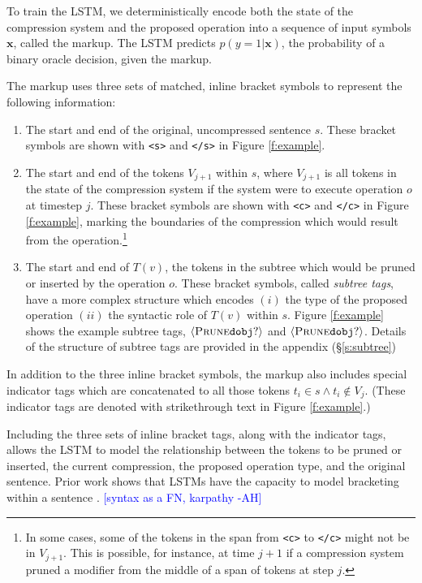 \documentclass[11pt,a4paper]{article}
\newcommand{\ahcomment}[1]{\textcolor{blue}{[#1 -AH]}}
\begin{document}
To train the LSTM, we deterministically encode both the state of the compression system and the proposed operation into a sequence of input symbols $\bm{x}$, called the markup. The LSTM predicts $p(y=1 | \bm{x})$, the probability of a binary oracle decision, given the markup. 

The markup uses three sets of matched, inline bracket symbols to represent the following information:

\begin{enumerate}
\item{The start and end of the original, uncompressed sentence $s$. These bracket symbols are shown with \texttt{<s>} and \texttt{</s>} in Figure \ref{f:example}.}
\item{The start and end of the tokens $V_{j+1}$ within $s$, where $V_{j+1}$ is all tokens in the state of the compression system if the system were to execute operation $o$ at timestep $j$. These bracket symbols are shown with \texttt{<c>} and \texttt{</c>} in Figure \ref{f:example}, marking the boundaries of the compression which would result from the operation.\footnote{In some cases, some of the tokens in the span from \texttt{<c>} to \texttt{</c>} might not be in $V_{j + 1}$. This is possible, for instance, at time $j+1$ if a compression system pruned a modifier from the middle of a span of tokens at step $j$.}}
\item{The start and end of $T(v)$, the tokens in the subtree which would be pruned or inserted by the operation $o$. These bracket symbols, called \textit{subtree tags}, have a more complex structure which encodes $(i)$ the type of the proposed operation $(ii)$ the syntactic role of $T(v)$ within $s$. Figure \ref{f:example} shows the example subtree tags, $\langle \textsc{Prune} \texttt{dobj} ? \rangle$ and $\langle \textsc{Prune} \texttt{dobj} ? \rangle$. Details of the structure of subtree tags are provided in the appendix (\S\ref{s:subtree})}
\end{enumerate}

In addition to the three inline bracket symbols, the markup also includes special indicator tags which are concatenated to all those tokens $t_i \in s \wedge t_i \notin V_j$. (These indicator tags are denoted with strikethrough text in Figure \ref{f:example}.) 

Including the  three sets of inline bracket tags, along with the indicator tags, allows the LSTM to model the relationship between the tokens to be pruned or inserted, the current compression, the proposed operation type, and the original sentence. Prior work shows that LSTMs have the capacity to model bracketing within a sentence \cite{Vinyals2015GrammarAA,Aharoni2017TowardsSN}. \ahcomment{syntax as a FN, karpathy}
\end{document}
